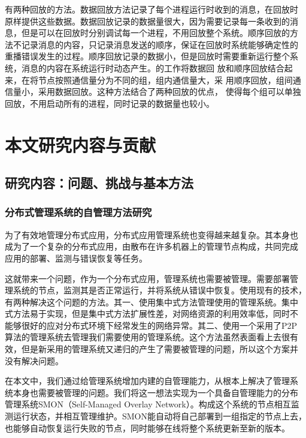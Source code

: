 有两种回放的方法。数据回放方法记录了每个进程运行时收到的消息，在回放时
原样提供这些数据。数据回放记录的数据量很大，因为需要记录每一条收到的消
息，但是可以在回放时分别调试每一个进程，不用回放整个系统。顺序回放的方
法不记录消息的内容，只记录消息发送的顺序，保证在回放时系统能够确定性的
重播错误发生的过程。顺序回放记录的数据小，但是回放时需要重新运行整个系
统，消息的内容在系统运行时动态产生。的工作将数据回
放和顺序回放结合起来，在将节点按照通信量分为不同的组，组内通信量大，采
用顺序回放，组间通信量小，采用数据回放。这种方法结合了两种回放的优点，
使得每个组可以单独回放，不用启动所有的进程，同时记录的数据量也较小。

% 
% 
% 
% 
% 
% 
% 
% 
% 
% 


\section{本文研究内容与贡献}
\label{sec:intro_contrib}

\subsection{研究内容：问题、挑战与基本方法}

\subsubsection*{分布式管理系统的自管理方法研究}

为了有效地管理分布式应用，分布式应用管理系统也变得越来越复杂。其本身也
成为了一个复杂的分布式应用，由散布在许多机器上的管理节点构成，共同完成
应用的部署、监测与错误恢复等任务。

这就带来一个问题，作为一个分布式应用，管理系统也需要被管理。需要部署管
理系统的节点，监测其是否正常运行，并将系统从错误中恢复。使用现有的技术，
有两种解决这个问题的方法。其一、使用集中式方法管理使用的管理系统。集中
式方法易于实现，但是集中式方法扩展性差，对网络资源的利用效率低，同时不
能够很好的应对分布式环境下经常发生的网络异常。其二、使用一个采用了P2P
算法的管理系统去管理我们需要使用的管理系统。这个方法虽然表面看上去很有
效，但是新采用的管理系统又递归的产生了需要被管理的问题，所以这个方案并
没有解决问题。

在本文中，我们通过给管理系统增加内建的自管理能力，从根本上解决了管理系
统本身也需要被管理的问题。我们将这一想法实现为一个具备自管理能力的分布
管理系统SMON（Self-Managed Overlay Network）。构成这个系统的节点相互监
测运行状态，并相互管理维护。SMON能自动将自己部署到一组指定的节点上去，
也能够自动恢复运行失败的节点，同时能够在线将整个系统更新至新的版本。

